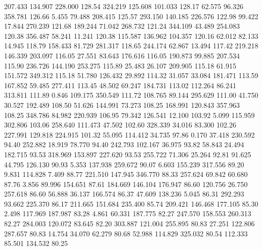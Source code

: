  207.433  134.907  228.000       128.54
 324.219  125.608  101.033       128.17
  62.575   96.326  358.781       126.66
   5.455   79.488  208.415       125.57
 293.150  140.185  226.576       122.98
  99.422   17.844  270.239       121.68
 189.244   71.042  268.732       121.24
 344.109   43.489  254.083       120.38
 356.487   58.241   11.241       120.38
 115.587  136.962  104.357       120.16
  62.012   82.133   14.945       118.79
 158.433   81.729  281.317       118.65
 244.174   62.867   13.494       117.42
 219.218  146.339  203.097       116.05
  27.551   83.643  176.616       116.05
 190.873   99.885  207.534       115.90
 236.726  144.190  253.275       115.89
  25.483   26.107  209.905       115.18
  61.915  151.572  349.312       115.18
  51.780  126.432   29.892       114.32
  31.057   33.084  181.471       113.59
 167.852   59.485  277.411       113.45
  48.502   69.247  184.731       113.02
 112.264   86.241  313.811       111.89
   0.846  109.175  350.549       111.72
 108.765   89.144  295.629       111.00
  41.750   30.527  192.489       108.50
  51.626  144.991   73.273       108.25
 168.991  120.843  357.963       108.25
 348.786   84.982  220.939       106.95
  79.342  126.541   12.100       103.92
   5.099  115.959  302.806       103.06
 258.640  111.473   47.502       102.60
 328.339   34.016   83.300       102.26
 227.991  129.818  224.915       101.32
  55.095  114.412   34.735        97.86
   0.170   37.418  230.592        94.40
 252.882   18.919   78.770        94.40
 242.793  102.167   36.975        93.82
  58.843   24.494  182.715        93.53
 318.969  153.897  227.620        93.53
 255.722   71.306   25.264        92.81
  91.625   44.795  126.130        90.93
   5.353  137.938  259.672        90.07
   6.603  155.239  317.556        89.20
   9.831  114.828    7.409        88.77
 221.510  147.945  346.770        88.33
 257.624   69.842   60.680        87.76
   3.856   89.996  154.651        87.61
 184.669  146.104  176.947        86.60
 120.756   26.750  257.618        86.60
  56.888   36.137  166.574        86.37
  47.609  138.236    5.045        86.31
 292.293   93.662  225.370        86.17
 211.665  151.684  235.400        85.74
 209.421  146.468  177.105        85.30
   2.498  117.969  187.987        83.28
   4.861   60.331  187.775        82.27
 247.570  158.553  260.313        82.27
 284.003  120.072   83.645        82.20
 303.887  121.004  255.895        80.83
  27.251  122.806  287.657        80.83
  14.754   34.070   62.279        80.68
  52.988  114.829  325.032        80.54
 112.333   85.501  134.532        80.25
